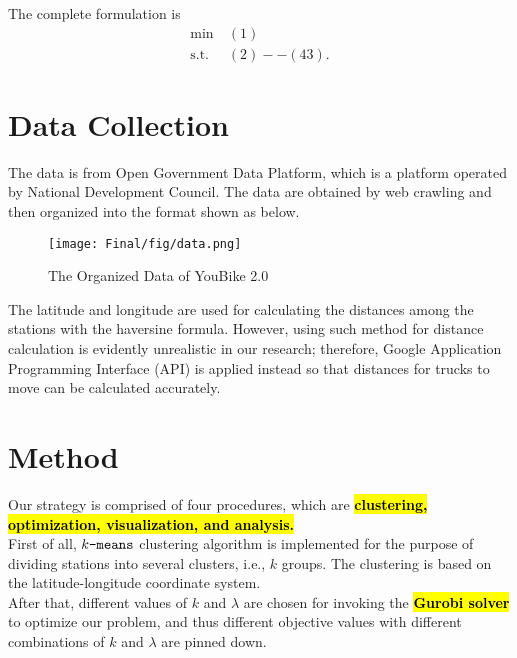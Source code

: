 \documentclass[a4paper, 12pt]{article}%
\theoremstyle{definition}
\begin{document}
\noindent The complete formulation is
\[\begin{split}
  \min \ & (1) \\
  \mbox{s.t.} & (2)--(43).
\end{split}\]



\section{Data Collection}
The data is from Open Government Data Platform, which is a platform operated by National Development Council. The data are obtained by web crawling and then organized into the format shown as below. \\

\begin{figure}[hbt]
    \centering
    \texttt{[image: Final/fig/data.png]}
    \caption{The Organized Data of YouBike 2.0}
    \label{fig:data}
\end{figure}



\noindent The latitude and longitude are used for calculating the distances among the stations with the haversine formula. However, using such method for distance calculation is evidently unrealistic in our research; therefore, Google Application Programming Interface (API) is applied instead so that distances for trucks to move can be calculated accurately. 

\section{Method}
\noindent Our strategy is comprised of four procedures, which are \hl{\textbf{clustering, optimization, visualization, and analysis.}} \\

\noindent First of all, $k \verb|-means|$ clustering algorithm is implemented for the purpose of dividing stations into several clusters, i.e., $k$ groups. The clustering is based on the latitude-longitude coordinate system. \\

\noindent After that, different values of $k$ and $\lambda$ are chosen for invoking the \hl{\textbf{Gurobi solver}} to optimize our problem, and thus different objective values with different combinations of $k$ and $\lambda$ are pinned down. \\
\end{document}
